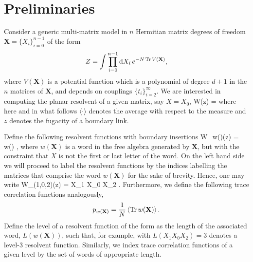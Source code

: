 \section{Preliminaries}
Consider a generic multi-matrix model in $n$ Hermitian matrix degrees of freedom
$\mathbf{X}=\{X_i\}_{i=0}^{n-1}$ of the form
%
\begin{equation}
    \label{loops1}
    Z = \int \prod_{i=0}^{n-1} \mathrm{d} X_i \, e^{-N\mathop{\mathrm{Tr}}\nolimits V(\mathbf{X})},
\end{equation}
%
where $V(\mathbf{X})$ is a potential function which is a polynomial of degree $d+1$ in the $n$
matrices of $\mathbf{X}$, and depends on couplings $\{t_i\}_{i=2}^{\infty}$. We are interested in
computing the planar resolvent of a given matrix, say $X = X_0$, \beq\label{res} W(z) =
    \left\langle \Tr {}\right\rangle
\eeq
\noindent where here and in what follows $\langle\cdot\rangle$ denotes the average with respect to the measure  and $z$ denotes the fugacity of a boundary link.

Define the following resolvent functions with boundary insertions
%
\beq\label{loopRes}
    W_{w()}(z) =  \left\langle \Tr  w()  \right\rangle,
\eeq
%
where $w(\mathbf{X})$ is a word in the free algebra generated by $\mathbf{X}$, but with the
constraint that $X$ is not the first or last letter of the word. On the left hand side we will
proceed to label the resolvent functions by the indices labelling the matrices that comprise the
word $w(\mathbf{X})$ for the sake of brevity. Hence, one may write
%
\beq\label{resExample}
    W_{(1,0,2)}(z) =  \left\langle \Tr X_1 X_0 X_2 \right\rangle.
\eeq
%
Furthermore, we define the following trace correlation functions analogously,
%
\begin{equation}
    \label{trace}
    p_{w(\mathbf{X})}= \frac{1}{N} \left\langle \mathop{\mathrm{Tr}}\nolimits w(\mathbf{X})\right\rangle.
\end{equation}
%
Define the level of a resolvent function of the form  as the length of the associated
word, $L(w(\mathbf{X}))$, such that, for example,  with $L(X_1 X_0 X_2)=3$ denotes
a level-3 resolvent function. Similarly, we index trace correlation functions of a given level by
the set of words of appropriate length.

